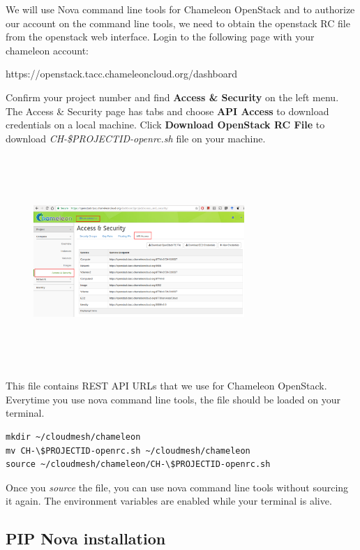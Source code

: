 We will use Nova command line tools for Chameleon OpenStack and to authorize
our account on the command line tools, we need to obtain the openstack RC file
from the openstack web interface. Login to the following page with your
chameleon account:


https://openstack.tacc.chameleoncloud.org/dashboard

Confirm your project number and find \textbf{Access \& Security} on the left menu.
The Access \& Security page has tabs and choose \textbf{API Access} to download
credentials on a local machine. Click \textbf{Download OpenStack RC File} to
download \textit{CH-\$PROJECTID-openrc.sh} file on your machine.

  \begin{figure}[!htbp]
    \includegraphics[width=8cm,height=8cm]{section/cloud/chameleon/images/openstack-chameleon-openrc.png}
    \centering
  \end{figure}

This file contains REST API URLs that we use for Chameleon OpenStack.
Everytime you use nova command line tools, the file should be loaded on your
terminal.

\begin{lstlisting}
mkdir ~/cloudmesh/chameleon
mv CH-\$PROJECTID-openrc.sh ~/cloudmesh/chameleon
source ~/cloudmesh/chameleon/CH-\$PROJECTID-openrc.sh
\end{lstlisting}

Once you \textit{source} the file, you can use nova command line tools without
sourcing it again.  The environment variables are enabled while your terminal
is alive.

\subsection{PIP Nova installation}

